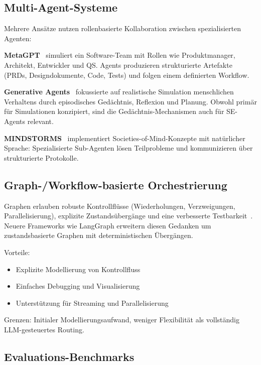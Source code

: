 \subsection{Multi-Agent-Systeme}

Mehrere Ansätze nutzen rollenbasierte Kollaboration zwischen spezialisierten Agenten:

\textbf{MetaGPT}~\cite{hong2023metagpt} simuliert ein Software-Team mit Rollen wie Produktmanager, Architekt, Entwickler und QS. Agents produzieren strukturierte Artefakte (PRDs, Designdokumente, Code, Tests) und folgen einem definierten Workflow.

\textbf{Generative Agents}~\cite{park2023generative} fokussierte auf realistische Simulation menschlichen Verhaltens durch episodisches Gedächtnis, Reflexion und Planung. Obwohl primär für Simulationen konzipiert, sind die Gedächtnis-Mechanismen auch für SE-Agents relevant.

\textbf{MINDSTORMS}~\cite{zhuge2023mindstorms} implementiert Societies-of-Mind-Konzepte mit natürlicher Sprache: Spezialisierte Sub-Agenten lösen Teilprobleme und kommunizieren über strukturierte Protokolle.

\subsection{Graph-/Workflow-basierte Orchestrierung}

Graphen erlauben robuste Kontrollflüsse (Wiederholungen, Verzweigungen, Parallelisierung), explizite Zustandsübergänge und eine verbesserte Testbarkeit~\cite{wu2023autogen}. Neuere Frameworks wie LangGraph erweitern diesen Gedanken um zustandsbasierte Graphen mit deterministischen Übergängen.

Vorteile:
\begin{itemize}
  \item Explizite Modellierung von Kontrollfluss
  \item Einfaches Debugging und Visualisierung
  \item Unterstützung für Streaming und Parallelisierung
\end{itemize}

Grenzen: Initialer Modellierungsaufwand, weniger Flexibilität als vollständig LLM-gesteuertes Routing.

\subsection{Evaluations-Benchmarks}

